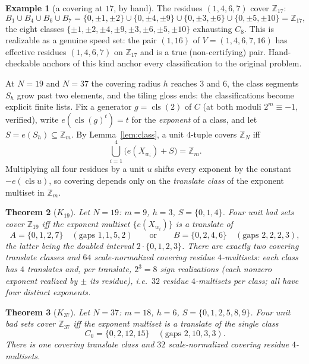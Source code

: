 \documentclass[11pt,a4paper]{article}
\numberwithin{equation}{section}
\theoremstyle{plain}
\newtheorem{theorem}{Theorem}[section]
\theoremstyle{definition}
\newtheorem{example}[theorem]{Example}
\theoremstyle{remark}
\newcommand{\Z}{\mathbb{Z}}
\DeclareMathOperator{\cls}{cls}
\begin{document}
\begin{example}[a covering at $17$, by hand]\label{ex:17}
The residues $(1,4,6,7)$ cover $\Z_{17}$:
\[
B_1\cup B_4\cup B_6\cup B_7
=\{0,\pm1,\pm2\}\cup\{0,\pm4,\pm9\}\cup\{0,\pm3,\pm6\}
 \cup\{0,\pm5,\pm10\}=\Z_{17},
\]
the eight classes $\{\pm1,\pm2,\pm4,\pm9,\pm3,\pm6,\pm5,\pm10\}$
exhausting $C_8$. This is realizable as a genuine speed set: the pair
$(1,16)$ of $V=(1,4,6,7,16)$ has effective residues $(1,4,6,7)$ on
$\Z_{17}$ and is a true (non-certifying) pair. Hand-checkable anchors of
this kind anchor every classification to the original problem.
\end{example}

At $N=19$ and $N=37$ the covering radius $h$ reaches $3$ and $6$, the
class segments $S_h$ grow past two elements, and the tiling gloss ends:
the classifications become explicit finite lists. Fix a generator
$g=\cls(2)$ of $C$ (at both moduli $2^{m}\equiv -1$, verified), write
$e(\cls(g)^t)=t$ for the \emph{exponent} of a class, and let
$S=e(S_h)\subseteq\Z_m$. By Lemma~\ref{lem:class}, a unit $4$-tuple
covers $\Z_N$ iff
\[
\bigcup_{i=1}^{4}\bigl(e(X_{w_i})+S\bigr)=\Z_m .
\]
Multiplying all four residues by a unit $u$ shifts every exponent by the
constant $-e(\cls u)$, so covering depends only on the \emph{translate
class} of the exponent multiset in $\Z_m$.

\begin{theorem}[$K_{19}$]\label{thm:K19}
Let $N=19$: $m=9$, $h=3$, $S=\{0,1,4\}$. Four unit bad sets cover
$\Z_{19}$ iff the exponent multiset $\{e(X_{w_i})\}$ is a translate of
\[
A=\{0,1,2,7\}\quad(\text{gaps }1,1,5,2)
\qquad\text{or}\qquad
B=\{0,2,4,6\}\quad(\text{gaps }2,2,2,3),
\]
the latter being the doubled interval $2\cdot\{0,1,2,3\}$. There are
exactly two covering translate classes and $64$ scale-normalized covering
residue $4$-multisets: each class has $4$ translates and, per translate,
$2^3=8$ sign realizations (each nonzero exponent realized by $\pm$ its
residue), i.e.\ $32$ residue $4$-multisets per class; all have four
distinct exponents.
\end{theorem}

\begin{theorem}[$K_{37}$]\label{thm:K37}
Let $N=37$: $m=18$, $h=6$, $S=\{0,1,2,5,8,9\}$. Four unit bad sets cover
$\Z_{37}$ iff the exponent multiset is a translate of the single class
\[
C_0=\{0,2,12,15\}\quad(\text{gaps }2,10,3,3).
\]
There is one covering translate class and $32$ scale-normalized covering
residue $4$-multisets.
\end{theorem}
\end{document}
